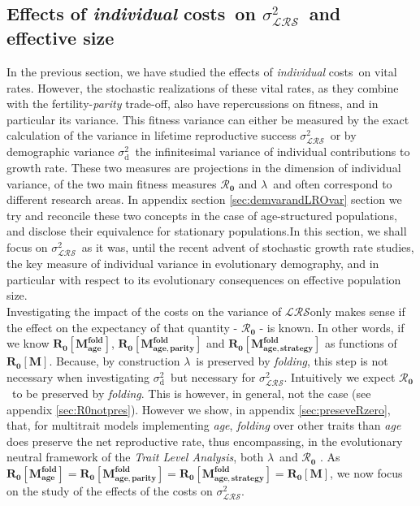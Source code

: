 \documentclass[10pt,a4paper]{article}
\newcommand{\lam}{$\lambda$}
\newcommand{\Rzero}{$\boldsymbol{\mathcal{R}_{0}}$  }
\newcommand{\LRO}{$\mathcal{LRS}$}
\newcommand{\PCoR}{\emph{individual} costs}
\newcommand{\vLRO}{$\sigma_{\mathrm{\mathcal{LRS}}}^2$}
\newcommand{\vd}{$\sigma_{\mathrm{d}}^2$}
\begin{document}
\subsection{Effects of \PCoR\ on \vLRO\ and effective size} %
\label{sec:eff_on_eff_size}
In the previous section, we have studied the effects of \PCoR\ on vital rates. However, the stochastic realizations of these vital rates, as they combine with the fertility-\emph{parity} trade-off, also have repercussions on fitness, and in particular its variance. This fitness variance can either be measured by the exact calculation of the variance in lifetime reproductive success \vLRO\, or by demographic variance \vd\, the infinitesimal variance of individual contributions to growth rate. %
 These two measures are projections in the dimension of individual variance, of the two main fitness measures \Rzero and \lam\ and often correspond to different research areas.  
In appendix section \ref{sec:demvarandLROvar} section we try and reconcile these two concepts in the case of age-structured populations, and disclose  their equivalence for stationary populations.In this section, we shall focus on \vLRO\ as it was, until the recent advent of stochastic growth rate studies, the key measure of individual variance in evolutionary demography, and in particular with respect to its evolutionary consequences on effective population size.\\

Investigating the impact of the costs on the variance of \LRO only makes sense if the effect on the expectancy of that quantity - \Rzero - is known. In other words, if we know $\mathbf{R_{0}}\left[\mathbf{M^{fold}_{age}}\right]$, $\mathbf{R_{0}}\left[\mathbf{M^{fold}_{age,parity}}\right]$ and $\mathbf{R_{0}}\left[\mathbf{M^{fold}_{age,strategy}}\right]$ as functions of $\mathbf{R_{0}}\left[\mathbf{M}\right]$. Because, by construction \lam\ is preserved by \emph{folding}, this step is not necessary when investigating \vd\, but necessary for \vLRO. Intuitively we expect \Rzero\ to be preserved by \emph{folding}. This is however, in general, not the case (see appendix \ref{sec:R0notpres}). However we show, in appendix \ref{sec:preseveRzero}, that, for multitrait models implementing \emph{age}, \emph{folding} over other traits than \emph{age} does preserve the net reproductive rate, thus encompassing, in the evolutionary neutral framework of the \emph{Trait Level Analysis}, both \lam\ and \Rzero. As $\mathbf{R_{0}}\left[\mathbf{M^{fold}_{age}}\right]=\mathbf{R_{0}}\left[\mathbf{M^{fold}_{age,parity}}\right]=\mathbf{R_{0}}\left[\mathbf{M^{fold}_{age,strategy}}\right]=\mathbf{R_{0}}\left[\mathbf{M}\right]$, we now focus on the study of the effects of the costs on \vLRO.
\end{document}
